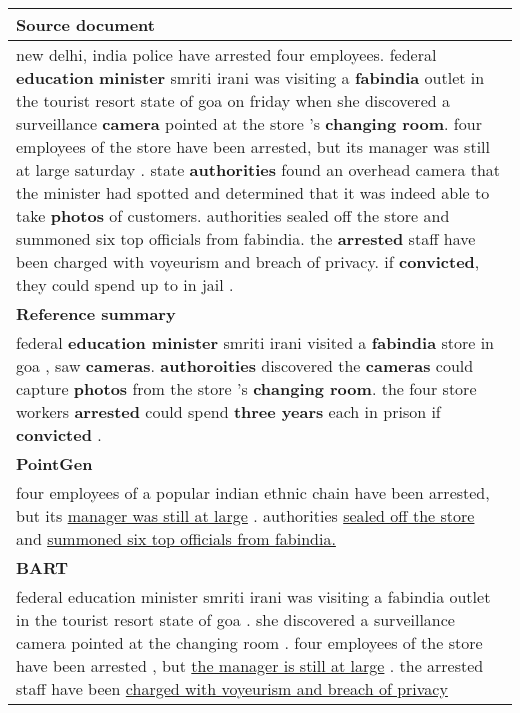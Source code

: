 \begin{table}[th]
\begin{center}
\small
\begin{tabular}{|p{7.5cm}|}
\hline \bf Source document \\
\hline new delhi, india police have arrested four employees. federal \textbf{education} 
       \textbf{minister} smriti irani was visiting a \textbf{fabindia} outlet in the tourist resort 
	   state of goa on friday when she discovered a surveillance \textbf{camera} pointed
	   at the store 's \textbf{changing room}. four employees of the store have been 
	   arrested, but its manager was still at large saturday . state \textbf{authorities} 
	   found an overhead camera that the minister had spotted and determined 
	   that it was indeed able to take \textbf{photos} of customers. authorities sealed
	   off the store and summoned six top officials from fabindia. the \textbf{arrested} 
	   staff have been charged with voyeurism and breach of privacy. 
	   if \textbf{convicted}, they could spend up to \text{three years} in jail . \\
\hline \bf Reference summary \\
\hline federal \textbf{education minister} smriti irani visited a \textbf{fabindia} store in goa ,
       saw \textbf{cameras}. \textbf{authoroities} discovered the \textbf{cameras} could capture 
	   \textbf{photos} from the store 's \textbf{changing room}. the four store workers 
	   \textbf{arrested} could spend \textbf{three years} each in prison if \textbf{convicted} . \\
\hline \bf PointGen \cite{SeeLM17} \\
\hline four employees of a popular indian ethnic chain have been arrested, 
       but its \underline{manager was still at large} . authorities \underline{sealed off the store} 
	   and \underline{summoned six top officials from fabindia.} \vspace*{0.8mm} \\ 
\hline \bf BART \cite{BART19} \\
\hline federal education minister smriti irani was visiting a fabindia outlet in 
       the tourist resort state of goa . she discovered a surveillance camera 
	   pointed at the changing room . four employees of the store have been 
	   arrested , but \underline{the manager is still at large} . the arrested staff have been 
	   \underline{charged with voyeurism and breach of privacy} \vspace*{0.8mm} \\

\end{tabular}
\end{center}
\end{table}
